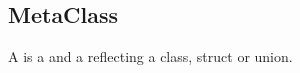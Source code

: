 \subsection{MetaClass}
\label{concept-MetaClass}

A  is a  and a 
reflecting a class, struct or union.




